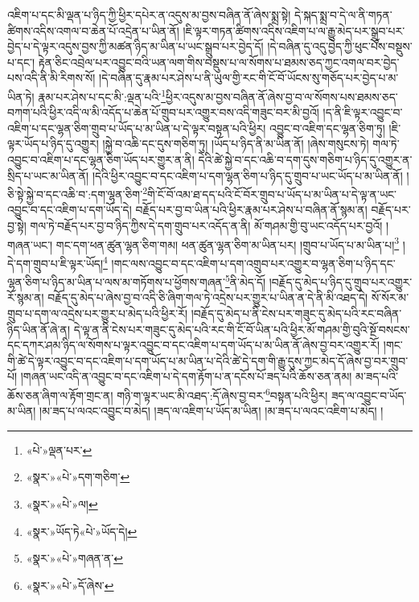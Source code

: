 འཇིག་པ་དང་མི་ལྡན་པ་ཉིད་ཀྱི་ཕྱིར་དཔེར་ན་འདུས་མ་བྱས་བཞིན་ནོ་ཞེས་སྨྲ་སྟེ། དེ་སྐད་སྨྲ་བ་དེ་ལ་ནི་གཏན་ཚིགས་འདིས་འགལ་བ་ཆེན་པོ་འདྲེན་པ་ཡིན་ནོ། །ཇི་ལྟར་གཏན་ཚིགས་འདིས་འཇིག་པ་ལ་རྒྱུ་མེད་པར་སྒྲུབ་པར་བྱེད་པ་དེ་ལྟར་འདུས་བྱས་ཀྱི་མཚན་ཉིད་མ་ཡིན་པ་ཡང་སྒྲུབ་པར་བྱེད་དོ། །དེ་བཞིན་དུ་འདུ་བྱེད་ཀྱི་ཕུང་པོས་བསྡུས་པ་དང་། རྟེན་ཅིང་འབྲེལ་པར་འབྱུང་བའི་ཡན་ལག་གིས་བསྡུས་པ་ལ་སོགས་པ་ཐམས་ཅད་ཀྱང་འགལ་བར་བྱེད་པས་འདི་ནི་མི་རིགས་སོ། །དེ་བཞིན་དུ་རྣམ་པར་ཤེས་པ་ནི་ཡུལ་གྱི་རང་གི་ངོ་བོ་ཡོངས་སུ་གཅོད་པར་བྱེད་པ་མ་ཡིན་ཏེ། རྣམ་པར་ཤེས་པ་དང་མི་:ལྡན་པའི་\footnote{«པེ་»ལྡན་པར་}ཕྱིར་འདུས་མ་བྱས་བཞིན་ནོ་ཞེས་བྱ་བ་ལ་སོགས་པས་ཐམས་ཅད་བཀག་པའི་ཕྱིར་འདི་ལ་མི་འདོད་པ་ཆེན་པོ་གྲུབ་པར་འགྱུར་བས་འདི་གཟུང་བར་མི་བྱའོ། །ད་ནི་ཇི་ལྟར་འབྱུང་བ་འཇིག་པ་དང་ལྷན་ཅིག་གྲུབ་པ་ཡོད་པ་མ་ཡིན་པ་དེ་ལྟར་བསྟན་པའི་ཕྱིར། འབྱུང་བ་འཇིག་དང་ལྷན་ཅིག་ཏུ། །ཇི་ལྟར་ཡོད་པ་ཉིད་དུ་འགྱུར། །སྐྱེ་བ་འཆི་དང་དུས་གཅིག་ཏུ། །ཡོད་པ་ཉིད་ནི་མ་ཡིན་ནོ། །ཞེས་གསུངས་ཏེ། གལ་ཏེ་འབྱུང་བ་འཇིག་པ་དང་ལྷན་ཅིག་ཡོད་པར་གྱུར་ན་ནི། དེའི་ཚེ་སྐྱེ་བ་དང་འཆི་བ་དག་དུས་གཅིག་པ་ཉིད་དུ་འགྱུར་ན་སྲིད་པ་ཡང་མ་ཡིན་ནོ། །དེའི་ཕྱིར་འབྱུང་བ་དང་འཇིག་པ་དག་ལྷན་ཅིག་པ་ཉིད་དུ་གྲུབ་པ་ཡང་ཡོད་པ་མ་ཡིན་ནོ། །ཅི་སྟེ་སྐྱེ་བ་དང་འཆི་བ་:དག་ལྷན་ཅིག་\footnote{«སྣར་»«པེ་»དག་གཅིག་}གི་ངོ་བོ་འམ་ཐ་དད་པའི་ངོ་བོར་གྲུབ་པ་ཡོད་པ་མ་ཡིན་པ་དེ་ལྟ་ན་ཡང་འབྱུང་བ་དང་འཇིག་པ་དག་ཡོད་དེ། བརྗོད་པར་བྱ་བ་ཡིན་པའི་ཕྱིར་རྣམ་པར་ཤེས་པ་བཞིན་ནོ་སྙམ་ན། བརྗོད་པར་བྱ་སྟེ། གལ་ཏེ་བརྗོད་པར་བྱ་བ་ཉིད་ཀྱིས་དེ་དག་གྲུབ་པར་འདོད་ན་ནི། མོ་གཤམ་གྱི་བུ་ཡང་འདོད་པར་བྱའོ། །གཞན་ཡང་། གང་དག་ཕན་ཚུན་ལྷན་ཅིག་གམ། ཕན་ཚུན་ལྷན་ཅིག་མ་ཡིན་པར། །གྲུབ་པ་ཡོད་པ་མ་ཡིན་པ།\footnote{«སྣར་»«པེ་»ལ།} །དེ་དག་གྲུབ་པ་ཇི་ལྟར་ཡོད།\footnote{«སྣར་»ཡོད་ཏེ«པེ་»ཡོད་དེ།} །གང་ལས་འབྱུང་བ་དང་འཇིག་པ་དག་འགྲུབ་པར་འགྱུར་བ་ལྷན་ཅིག་པ་ཉིད་དང་ལྷན་ཅིག་པ་ཉིད་མ་ཡིན་པ་ལས་མ་གཏོགས་པ་ཕྱོགས་གཞན་\footnote{«སྣར་»«པེ་»གཞན་ན་}ནི་མེད་དོ། །བརྗོད་དུ་མེད་པ་ཉིད་དུ་གྲུབ་པར་འགྱུར་རོ་སྙམ་ན། བརྗོད་དུ་མེད་པ་ཞེས་བྱ་བ་འདི་ཅི་ཞིག་གལ་ཏེ་འདྲེས་པར་གྱུར་པ་ཡིན་ན་དེ་ནི་མི་འཐད་དེ། སོ་སོར་མ་གྲུབ་པ་དག་ལ་འདྲེས་པར་གྱུར་པ་མེད་པའི་ཕྱིར་རོ། །བརྗོད་དུ་མེད་པ་ནི་ངེས་པར་གཟུང་དུ་མེད་པའི་རང་བཞིན་ཉིད་ཡིན་ནོ་ཞེ་ན། དེ་ལྟ་ན་ནི་ངེས་པར་གཟུང་དུ་མེད་པའི་རང་གི་ངོ་བོ་ཡིན་པའི་ཕྱིར་མོ་གཤམ་གྱི་བུའི་སྔོ་བསངས་དང་དཀར་ཤམ་ཉིད་ལ་སོགས་པ་ལྟར་འབྱུང་བ་དང་འཇིག་པ་དག་ཡོད་པ་མ་ཡིན་ནོ་ཞེས་བྱ་བར་འགྱུར་རོ། །གང་གི་ཚེ་དེ་ལྟར་འབྱུང་བ་དང་འཇིག་པ་དག་ཡོད་པ་མ་ཡིན་པ་དེའི་ཚེ་དེ་དག་གི་རྒྱུ་དུས་ཀྱང་མེད་དོ་ཞེས་བྱ་བར་གྲུབ་པོ། །གཞན་ཡང་འདི་ན་འབྱུང་བ་དང་འཇིག་པ་དེ་དག་རྟོག་པ་ན་དངོས་པོ་ཟད་པའི་ཆོས་ཅན་ནམ། མ་ཟད་པའི་ཆོས་ཅན་ཞིག་ལ་རྟོག་གྲང་ན། གཉི་ག་ལྟར་ཡང་མི་འཐད་:དོ་ཞེས་བྱ་བར་\footnote{«སྣར་»«པེ་»དོ་ཞེས་}བསྟན་པའི་ཕྱིར། ཟད་ལ་འབྱུང་བ་ཡོད་མ་ཡིན། །མ་ཟད་པ་ལའང་འབྱུང་བ་མེད། །ཟད་ལ་འཇིག་པ་ཡོད་མ་ཡིན། །མ་ཟད་པ་ལའང་འཇིག་པ་མེད། །
